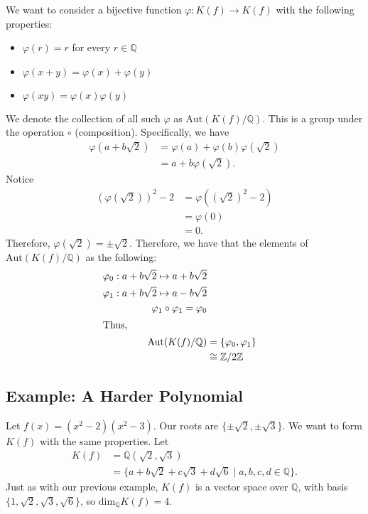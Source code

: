 \documentclass[10pt]{extarticle}
\newcommand{\Q}{\mathbb{Q}}
\newcommand{\Z}{\mathbb{Z}}
\begin{document}
  We want to consider a bijective function $\varphi: K(f)\rightarrow K(f)$ with the following properties:
  \begin{itemize}
    \item $\varphi(r) = r$ for every $r\in\Q$
    \item $\varphi(x+y) = \varphi(x) + \varphi(y)$
    \item $\varphi(xy) = \varphi(x)\varphi(y)$
  \end{itemize}
  We denote the collection of all such $\varphi$ as $\text{Aut}(K(f)/\Q)$. This is a group under the operation $\circ$ (composition). Specifically, we have
  \begin{align*}
    \varphi(a+b\sqrt{2}) &= \varphi(a) + \varphi(b)\varphi(\sqrt{2})\\
                         &= a + b\varphi(\sqrt{2}).
  \end{align*}
  Notice
  \begin{align*}
    \left(\varphi(\sqrt{2})\right)^2 - 2 &= \varphi \left(\left(\sqrt{2}\right)^2 - 2\right)\\
                            &= \varphi(0)\\
                            &= 0.
  \end{align*}
  Therefore, $\varphi(\sqrt{2}) = \pm \sqrt{2}$. Therefore, we have that the elements of $\text{Aut}(K(f)/\Q)$ as the following:
  \begin{align*}
    \varphi_0: a+b\sqrt{2} \mapsto a+b\sqrt{2}\\
    \varphi_1: a+b\sqrt{2} \mapsto a-b\sqrt{2}\\
    \varphi_1\circ\varphi_1 = \varphi_0\\
    \shortintertext{Thus,}
    \text{Aut}(K(f)/\Q) &= \{\varphi_0,\varphi_1\}\\
                        &\cong \Z/2\Z
  \end{align*}
  \subsection{Example: A Harder Polynomial}%
  Let $f(x) = (x^2-2)(x^2-3)$. Our roots are $\{\pm\sqrt{2},\pm\sqrt{3}\}$. We want to form $K(f)$ with the same properties. Let
  \begin{align*}
    K(f) &= \Q(\sqrt{2},\sqrt{3})\\
    &= \{a+b\sqrt{2}+c\sqrt{3}+d\sqrt{6}\mid a,b,c,d\in\Q\}.
  \end{align*}
  Just as with our previous example, $K(f)$ is a vector space over $\Q$, with basis $\{1,\sqrt{2},\sqrt{3},\sqrt{6}\}$, so $\text{dim}_{\Q}K(f) = 4$.\\
\end{document}
